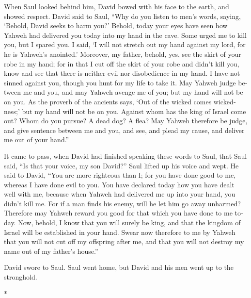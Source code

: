 \begin{paracol}{2}
\begin{otherlanguage}{english}
When Saul looked behind him, David bowed with his face to the earth, and
showed respect.  David said to Saul, ``Why do you listen
to men's words, saying, `Behold, David seeks to harm you?'
 Behold, today your eyes have seen how Yahweh had
delivered you today into my hand in the cave. Some urged me to kill you,
but I spared you. I said, `I will not stretch out my hand against my
lord, for he is Yahweh's anointed.'  Moreover, my father,
behold, yes, see the skirt of your robe in my hand; for in that I cut
off the skirt of your robe and didn't kill you, know and see that there
is neither evil nor disobedience in my hand. I have not sinned against
you, though you hunt for my life to take it.  May Yahweh
judge between me and you, and may Yahweh avenge me of you; but my hand
will not be on you.  As the proverb of the ancients says,
`Out of the wicked comes wickedness;' but my hand will not be on you.
 Against whom has the king of Israel come out? Whom do
you pursue? A dead dog? A flea?  May Yahweh therefore be
judge, and give sentence between me and you, and see, and plead my
cause, and deliver me out of your hand.''

 It came to pass, when David had finished speaking these
words to Saul, that Saul said, ``Is that your voice, my son David?''
Saul lifted up his voice and wept.  He said to David,
``You are more righteous than I; for you have done good to me, whereas I
have done evil to you.  You have declared today how you
have dealt well with me, because when Yahweh had delivered me up into
your hand, you didn't kill me.  For if a man finds his
enemy, will he let him go away unharmed? Therefore may Yahweh reward you
good for that which you have done to me today.  Now,
behold, I know that you will surely be king, and that the kingdom of
Israel will be established in your hand.  Swear now
therefore to me by Yahweh that you will not cut off my offspring after
me, and that you will not destroy my name out of my father's house.''

 David swore to Saul. Saul went home, but David and his
men went up to the stronghold.

\end{otherlanguage}

\switchcolumn[0]*

\hypertarget{la-muerte-de-samuel-la-locura-de-nabal-david-y-abigail}{%
}
\end{paracol}
